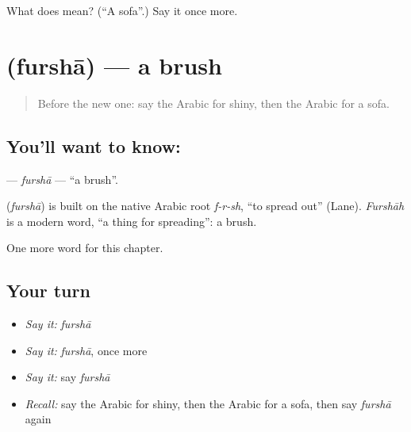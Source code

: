 \begin{tcolorbox}[breakable,colback=teal!4,colframe=teal!35!black,title={Before you move on}]
What does  mean? (\textquotedblleft{}A sofa\textquotedblright{}.) Say it once more.
\end{tcolorbox}
\section[\texorpdfstring{\ar{فرشاة} (furshā)}{فرشاة (furshā)}]{ (furshā) — a brush}

\label{lesson:AR-C213-fursha}



\begin{quote}
Before the new one: say the Arabic for shiny, then the Arabic for a sofa.
\end{quote}

\subsection*{You'll want to know: }
\textbf{} — \emph{furshā} — \textquotedblleft{}a brush\textquotedblright{}.

\begin{cousinweb}
\textbf{} (\emph{furshā}) is built on the native Arabic root \emph{f-r-sh}, \textquotedblleft{}to spread out\textquotedblright{} (Lane). \emph{Furshāh} is a modern word, \textquotedblleft{}a thing for spreading\textquotedblright{}: a brush.
\end{cousinweb}

\begin{grammarlens}[title={What you've built}]
One more word for this chapter.
\end{grammarlens}

\subsection*{Your turn}
\begin{itemize}
\raggedright
  \item \emph{Say it:} \emph{furshā}
  \item \emph{Say it:} \emph{furshā}, once more
  \item \emph{Say it:} say \emph{furshā}
  \item \emph{Recall:} say the Arabic for shiny, then the Arabic for a sofa, then say \emph{furshā} again
\end{itemize}


